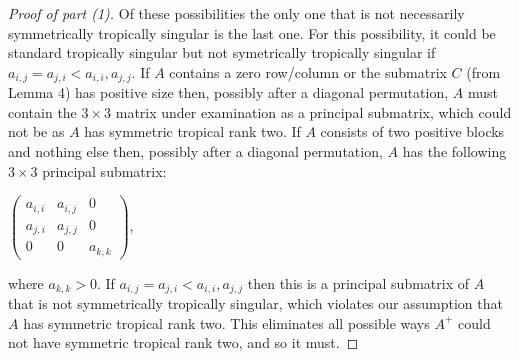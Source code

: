 \documentclass{article}
\begin{document}
\begin{proof}[Proof of part (1)]
  Of these possibilities the only one that is not necessarily symmetrically tropically singular is the last one. For this possibility, it could be standard tropically singular but not symetrically tropically singular if $a_{i,j} = a_{j,i} < a_{i,i},a_{j,j}$. If $A$ contains a zero row/column or the submatrix $C$ (from Lemma 4) has positive size then, possibly after a diagonal permutation, $A$ must contain the $3 \times 3$ matrix under examination as a principal submatrix, which could not be as $A$ has symmetric tropical rank two. If $A$ consists of two positive blocks and nothing else then, possibly after a diagonal permutation, $A$ has the following $3 \times 3$ principal submatrix:
  \begin{center}
    $\left(\begin{array}{ccc} a_{i,i} & a_{i,j} & 0 \\ a_{j,i} & a_{j,j} & 0 \\ 0 & 0 & a_{k,k} \end{array}\right)$,
  \end{center}
  where $a_{k,k} > 0$. If $a_{i,j} = a_{j,i} < a_{i,i}, a_{j,j}$ then this is a principal submatrix of $A$ that is not symmetrically tropically singular, which violates our assumption that $A$ has symmetric tropical rank two. This eliminates all possible ways $A^{+}$ could not have symmetric tropical rank two, and so it must.
\end{proof}
\end{document}

